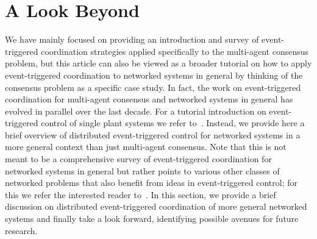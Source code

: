 \documentclass{autart}
\begin{document}
{
  \section{A Look Beyond}\label{se:beyond}

  We have mainly focused on providing an introduction and survey of
  event-triggered coordination strategies applied specifically to the
  multi-agent consensus problem, but this article can also be viewed
  as a broader tutorial on how to apply event-triggered coordination
  to networked systems in general by thinking of the consensus problem
  as a specific case study.  In fact, the work on event-triggered
  coordination for multi-agent consensus and networked systems in
  general has evolved in parallel over the last decade. For a tutorial
  introduction on event-triggered control of single plant systems we
  refer to~\citep{WPMHH-KHJ-PT:12}. Instead, we provide here a brief
  overview of distributed event-triggered control for networked
  systems in a more general context than just multi-agent
  consensus. Note that this is not meant to be a comprehensive survey
  of event-triggered coordination for networked systems in general but
  rather points to various other classes of networked problems that
  also benefit from ideas in event-triggered control; for this we
  refer the interested reader to~\citep{DT-SH:17}.  In this section,
  we provide a brief discussion on distributed event-triggered
  coordination of more general networked systems and finally take a
  look forward, identifying possible avenues for future research.

}
\end{document}
